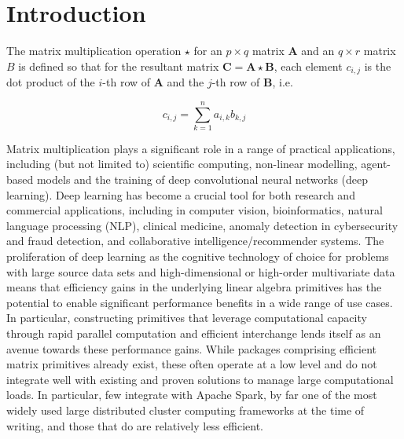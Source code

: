\documentclass[fleqn,10pt]{SelfArx} %
\affiliation{\textsuperscript{1}\textit{Starschema Inc., Arlington, VA.}} %
\affiliation{*\textbf{Corresponding author}: tfoldi@starschema.net} %
\begin{document}
\maketitle %


\section{Introduction} %
\label{sec:introduction}

The matrix multiplication operation $\star$ for an $p \times q$ matrix $\mathbf{A}$ and an $q \times r$ matrix $B$ is defined so that for the resultant matrix $\mathbf{C} = \mathbf{A} \star \mathbf{B}$, each element $c_{i, j}$ is the dot product of the $i$-th row of $\mathbf{A}$ and the $j$-th row of $\mathbf{B}$, i.e.

$$ c_{i, j} = \sum_{k = 1}^n a_{i, k} b_{k, j} $$

Matrix multiplication plays a significant role in a range of practical applications, including (but not limited to) scientific computing, non-linear modelling, agent-based models and the training of deep convolutional neural networks (deep learning). Deep learning has become a crucial tool for both research and commercial applications, including in computer vision,\cite{guo2016deep,voulodimos2018deep}  bioinformatics,\cite{spencer2014deep,alipanahi2015predicting,zhang2016deep,wei2018prediction} natural language processing (NLP),\cite{deselaers2009deep,socher2012deep,young2018recent,otter2020survey} clinical medicine,\cite{bar2015chest,havaei2016deep,liu2017detecting,stead2018clinical,campanella2019clinical,lehman2019mammographic} anomaly detection in cybersecurity and fraud detection,\cite{du2017deeplog,shone2018deep,chalapathy2019deep} and collaborative intelligence/recommender systems.\cite{wang2015collaborative,deng2016deep,karatzoglou2017deep,batmaz2019review} The proliferation of deep learning as the cognitive technology of choice for problems with large source data sets and high-dimensional or high-order multivariate data means that efficiency gains in the underlying linear algebra primitives has the potential to enable significant performance benefits in a wide range of use cases. In particular, constructing primitives that leverage computational capacity through rapid parallel computation and efficient interchange lends itself as an avenue towards these performance gains. While packages comprising efficient matrix primitives already exist,\cite{chetlur2014cudnn} these often operate at a low level and do not integrate well with existing and proven solutions to manage large computational loads. In particular, few integrate with Apache Spark,\cite{zaharia2016apache} by far one of the most widely used large distributed cluster computing frameworks at the time of writing, and those that do are relatively less efficient.
\end{document}
